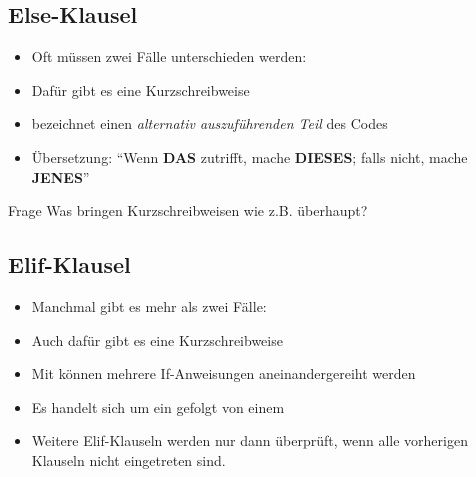 \subsection{Else-Klausel}

\begin{frame}
	\slidehead
	\begin{itemize}
		\item Oft müssen zwei Fälle unterschieden werden:
		\vspace{0.58cm}
		\item Dafür gibt es eine Kurzschreibweise
	\end{itemize}
\end{frame}

\begin{frame}
	\slidehead

	\begin{itemize}
		\item {} bezeichnet einen \textit{alternativ auszuführenden Teil} des Codes
		\item Übersetzung: "`Wenn \textbf{DAS} zutrifft, mache \textbf{DIESES}; falls nicht, mache \textbf{JENES}"'
	\end{itemize}

	\begin{block}{Frage}
		Was bringen Kurzschreibweisen wie z.B.  überhaupt?
	\end{block}
\end{frame}

\subsection{Elif-Klausel}

\begin{frame}
	\slidehead
	\begin{itemize}
		\item Manchmal gibt es mehr als zwei Fälle:
		\item Auch dafür gibt es eine Kurzschreibweise
	\end{itemize}
\end{frame}

\begin{frame}
	\slidehead

	\begin{itemize}
		\item Mit  können mehrere If-Anweisungen aneinandergereiht werden
		\item Es handelt sich um ein  gefolgt von einem 
		\item Weitere Elif-Klauseln werden nur dann überprüft, wenn alle vorherigen Klauseln nicht eingetreten sind.
	\end{itemize}
\end{frame}


